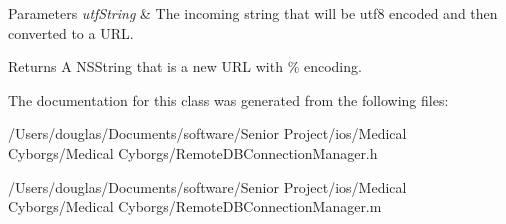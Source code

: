 \begin{DoxyParams}{Parameters}
{\em utf\-String} & The incoming string that will be utf8 encoded and then converted to a U\-R\-L.\\
\hline
\end{DoxyParams}
\begin{DoxyReturn}{Returns}
A N\-S\-String that is a new U\-R\-L with \% encoding. 
\end{DoxyReturn}


The documentation for this class was generated from the following files\-:\begin{DoxyCompactItemize}
\item 
/\-Users/douglas/\-Documents/software/\-Senior Project/ios/\-Medical Cyborgs/\-Medical Cyborgs/Remote\-D\-B\-Connection\-Manager.\-h\item 
/\-Users/douglas/\-Documents/software/\-Senior Project/ios/\-Medical Cyborgs/\-Medical Cyborgs/Remote\-D\-B\-Connection\-Manager.\-m\end{DoxyCompactItemize}

